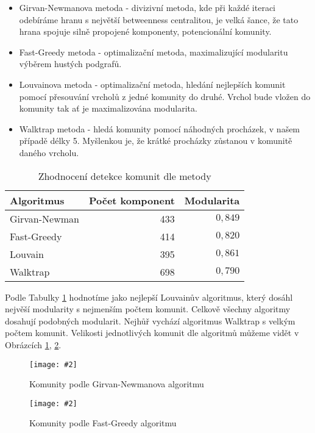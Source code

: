 \documentclass[a4paper,12pt]{article}
\newcommand{\image}[4]{\begin{figure}[h!] \centering \texttt{[image: \#2]} \caption{#4} \label{#3} \end{figure}}
\newcommand{\imageRotated}[4]{\begin{figure}[h!] \centering \texttt{[image: \#2]} \caption{#4} \label{#3} \end{figure}}
\begin{document}
\begin{itemize}
    \item Girvan-Newmanova metoda - divizivní metoda, kde při každé iteraci odebíráme hranu s největší betweenness centralitou, je velká šance, že tato hrana spojuje silně propojené komponenty, potencionální komunity.
    \item Fast-Greedy metoda - optimalizační metoda, maximalizující modularitu výběrem hustých podgrafů.
    \item Louvainova metoda - optimalizační metoda, hledání nejlepších komunit pomocí přesouvání vrcholů z jedné komunity do druhé. Vrchol bude vložen do komunity tak ať je maximalizována modularita.
    \item Walktrap metoda - hledá komunity pomocí náhodných procházek, v našem případě délky 5. Myšlenkou je, že krátké procházky zůstanou v komunitě daného vrcholu.
\end{itemize}

\begin{table}[h!]
    \centering
    \begin{tabular}{l | r | r}
        Algoritmus      & Počet komponent   & Modularita    \\\hline\hline
        Girvan-Newman   & 433               & $0,849$       \\
        Fast-Greedy     & 414               & $0,820$       \\
        Louvain         & 395               & $0,861$       \\
        Walktrap        & 698               & $0,790$       \\
    \end{tabular}
    \caption{Zhodnocení detekce komunit dle metody}
    \label{tab:community}
\end{table}

Podle Tabulky \ref{tab:community} hodnotíme jako nejlepší Louvainův algoritmus, který dosáhl nejvěší modularity s nejmenším počtem komunit. Celkově všechny
algoritmy dosahují podobných modularit. Nejhůř vychází algoritmus Walktrap s velkým počtem komunit. Velikosti jednotlivých komunit dle algoritmů můžeme vidět
v Obrázcích \ref{fig:gnc}, \ref{fig:communityRest}. %

\image{1}{../grafy/girvanNewmanCommunitySize.pdf}{fig:gnc}{Komunity podle Girvan-Newmanova algoritmu}

\imageRotated{1.6}{../grafy/community.pdf}{fig:communityRest}{Komunity podle Fast-Greedy algoritmu}
\end{document}
